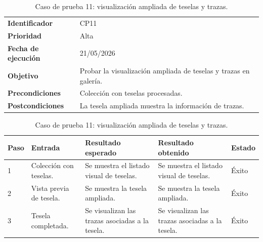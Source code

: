 \begin{table}[]
	\centering
	\footnotesize
	\renewcommand{\arraystretch}{1.2}
	\begin{tabularx}{\textwidth}{p{3.2cm} X}
		\toprule
		\textbf{Identificador} & CP11 \\
		\textbf{Prioridad} & Alta \\
		\textbf{Fecha de ejecución} & 21/05/2026 \\
		\textbf{Objetivo} & Probar la visualización ampliada de teselas y trazas en galería. \\
		\textbf{Precondiciones} & Colección con teselas procesadas. \\
		\textbf{Postcondiciones} & La tesela ampliada muestra la información de trazas. \\
		\midrule
	\end{tabularx}
	\begin{tabularx}{\textwidth}{p{0.8cm} p{3.2cm} X X p{1.3cm}}
		\textbf{Paso} & \textbf{Entrada} & \textbf{Resultado esperado} & \textbf{Resultado obtenido} & \textbf{Estado} \\
		\midrule
		1 & Colección con teselas. & Se muestra el listado visual de teselas. & Se muestra el listado visual de teselas. & Éxito \\
		2 & Vista previa de tesela. & Se muestra la tesela ampliada. & Se muestra la tesela ampliada. & Éxito \\
		3 & Tesela completada. & Se visualizan las trazas asociadas a la tesela. & Se visualizan las trazas asociadas a la tesela. & Éxito \\
		\bottomrule
	\end{tabularx}
	\caption{Caso de prueba 11: visualización ampliada de teselas y trazas.}
	\label{tab:cp11}
\end{table}

